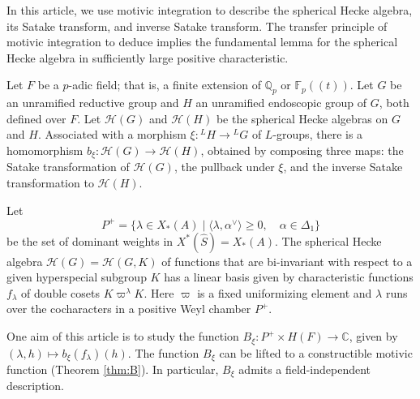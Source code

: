 
% 
% 


\newcommand{\XX}[1]{{\it  [To do: #1]}}
\newcommand{\ring}[1]{\mathbb{#1}}
\newcommand{\g}[1]{\langle{#1}\rangle}
\def\op#1{{\operatorname{#1}}}
\def\inv{\op{inv}}
\def\dom{P^+}
\def\Q{{\ring{Q}}}
\def\card{\op{card}}
\def\CSrho{[W_S\backslash C_\rho]}

\def\C{\mathcal C}
\def\N{\mathcal N}
\def\H{\mathcal H}
\def\M{\mathcal M}
\def\T{\mathcal T}

\def\n{{\mathfrak n}}


\def\libel#1{{\text{\sc [#1]~}}\label{#1}}
\def\rif#1{(\ref{#1}-{\text{\sc #1})}}




In this article, we use motivic integration to describe the spherical
Hecke algebra, its Satake transform, and inverse Satake transform.
The transfer principle of motivic integration to deduce implies the fundamental
lemma for the spherical Hecke algebra in sufficiently large positive characteristic.

Let $F$ be a $p$-adic field; that is, a finite extension of $\ring{Q}_p$ or $\ring{F}_p((t))$.
Let $G$ be an unramified reductive group and $H$ an unramified endoscopic group of $G$, both defined over $F$.
Let $\H(G)$ and $\H(H)$ be the spherical Hecke algebras on $G$ and $H$.
Associated with  a morphism $\xi:{}^LH\to {}^LG$ of $L$-groups, there is a homomorphism
$b_\xi:\H(G)\to \H(H)$, obtained by composing three maps: the Satake transformation of $\H(G)$,
the pullback under $\xi$, and the inverse Satake transformation to $\H(H)$.

Let 
\[
\dom = \{\lambda\in X_*(A) \mid \g{\lambda,\alpha^\vee}\ge 0,\quad \alpha\in \Delta_1\}
\]
be the set of dominant weights in $X^*(\hat S)=X_*(A)$.
The spherical Hecke algebra $\H(G)=\H(G,K)$ of functions that are bi-invariant with respect
to a given hyperspecial subgroup $K$ has a linear basis given by characteristic functions $f_\lambda$
of double cosets $K\varpi^\lambda K$.  Here $\varpi$ is a fixed uniformizing element and $\lambda$
runs over the cocharacters in a positive Weyl chamber $P^+$.

One aim of this article is to study the function $B_\xi:P^+\times H(F)\to \ring{C}$, given by
$(\lambda,h)\mapsto b_\xi(f_\lambda)(h)$.   The function $B_\xi$ can be lifted to a constructible motivic
function (Theorem \ref{thm:B}).   In particular, $B_\xi$ admits a field-independent description.  

